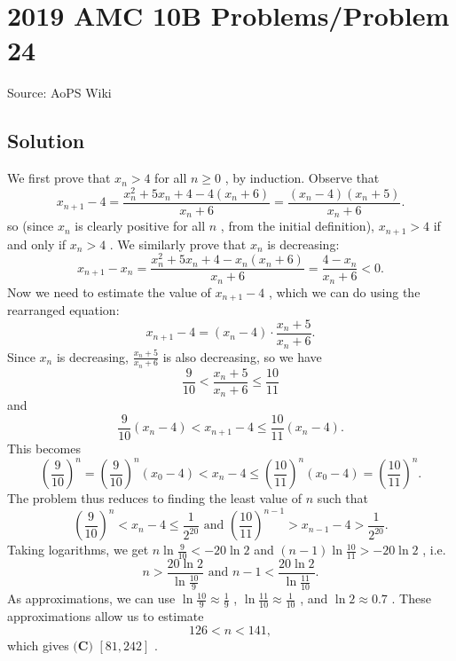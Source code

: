 \documentclass[12pt]{article}
\begin{document}
\section*{{2019 AMC 10B Problems/Problem 24}}
Source: AoPS Wiki

\subsection*{Solution}
We first prove that $x_n > 4$ for all $n \ge 0$ , by induction. Observe that \[x_{n+1} - 4 = \frac{x_n^2 + 5x_n + 4 - 4(x_n+6)}{x_n+6} = \frac{(x_n - 4)(x_n+5)}{x_n+6}.\] so (since $x_n$ is clearly positive for all $n$ , from the initial definition), $x_{n+1} > 4$ if and only if $x_{n} > 4$ . We similarly prove that $x_n$ is decreasing: \[x_{n+1} - x_n = \frac{x_n^2 + 5x_n + 4 - x_n(x_n+6)}{x_n+6} = \frac{4-x_n}{x_n+6} < 0.\] Now we need to estimate the value of $x_{n+1}-4$ , which we can do using the rearranged equation: \[x_{n+1} - 4 = (x_n-4)\cdot\frac{x_n + 5}{x_n+6}.\] Since $x_n$ is decreasing, $\frac{x_n + 5}{x_n+6}$ is also decreasing, so we have \[\frac{9}{10} < \frac{x_n + 5}{x_n+6} \le \frac{10}{11}\] and \[\frac{9}{10}(x_n-4) < x_{n+1} - 4 \le \frac{10}{11}(x_n-4).\] This becomes \[\left(\frac{9}{10}\right)^n = \left(\frac{9}{10}\right)^n \left(x_0-4\right) < x_{n} - 4 \le \left(\frac{10}{11}\right)^n \left(x_0-4\right) = \left(\frac{10}{11}\right)^n.\] The problem thus reduces to finding the least value of $n$ such that \[\left(\frac{9}{10}\right)^n < x_{n} - 4 \le \frac{1}{2^{20}} \text{ and } \left(\frac{10}{11}\right)^{n-1} > x_{n-1} - 4 > \frac{1}{2^{20}}.\] Taking logarithms, we get $n \ln \frac{9}{10} < -20 \ln 2$ and $(n-1)\ln \frac{10}{11} > -20 \ln 2$ , i.e. \[n > \frac{20\ln 2}{\ln\frac{10}{9}} \text{ and } n-1 < \frac{20\ln 2}{\ln\frac{11}{10}} .\] As approximations, we can use $\ln\frac{10}{9} \approx \frac{1}{9}$ , $\ln\frac{11}{10} \approx \frac{1}{10}$ , and $\ln 2\approx 0.7$ . These approximations allow us to estimate \[126 < n < 141,\] which gives $\boxed{\textbf{(C) } [81,242]}$ .
\end{document}
